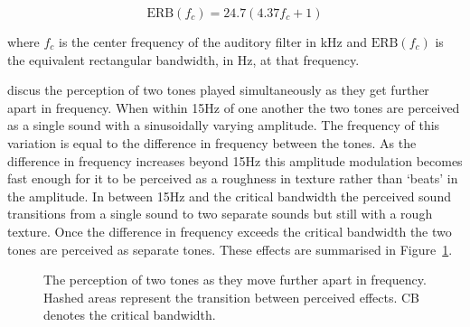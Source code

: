 		\begin{equation}
			\mathrm{ERB}(f_{c}) = 24.7(4.37f_{c} + 1)
			\label{eq:ERB}
		\end{equation}

		where $f_{c}$ is the center frequency of the auditory filter in kHz and $\mathrm{ERB}(f_{c})$ is the
		equivalent rectangular bandwidth, in Hz, at that frequency.

		\citet{howard2009acoustics} discus the perception of two tones played simultaneously as they get further
		apart in frequency. When within 15Hz of one another the two tones are perceived as a single sound with a
		sinusoidally varying amplitude. The frequency of this variation is equal to the difference in frequency
		between the tones. As the difference in frequency increases beyond 15Hz this amplitude modulation becomes
		fast enough for it to be perceived as a roughness in texture rather than `beats' in the amplitude. In
		between 15Hz and the critical bandwidth the perceived sound transitions from a single sound to two separate
		sounds but still with a rough texture. Once the difference in frequency exceeds the critical bandwidth the
		two tones are perceived as separate tones. These effects are summarised in Figure~\ref{fig:ToneSeparation}.

		\begin{figure}[h!]
			\centering
			\caption{The perception of two tones as they move further apart in frequency. Hashed areas
				 represent the transition between perceived effects. CB denotes the critical bandwidth.}
			\label{fig:ToneSeparation}
		\end{figure}

